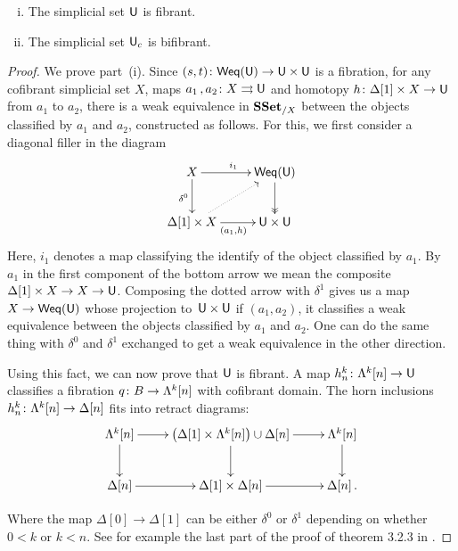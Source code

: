 \documentclass[reqno,10pt,a4paper,oneside,draft]{amsart}
\begin{document}
\begin{theorem} \label{thm:fibrancy-of-u-and-uc} \hfill 
\begin{enumerate}[(i)] 
\item The simplicial set $\mathsf{U}$ is fibrant. 
\item The simplicial set $\mathsf{U}_c$ is bifibrant. 
\end{enumerate}
\end{theorem}

\begin{proof} We prove part~(i). Since
$(s, t) \colon \mathsf{Weq}(\mathsf{U}) \rightarrow \mathsf{U} \times \mathsf{U}$ is a fibration, for any cofibrant 
simplicial set $X$,  maps $a_1 \, , a_2 \colon X \rightrightarrows \mathsf{U}$ and homotopy $h \colon \Delta[1] \times X \rightarrow \mathsf{U}$ from $a_1$ to $a_2$, there is a weak equivalence in $\mathbf{SSet}_{/X}$ between the objects classified by $a_1$ and $a_2$, constructed as follows. For this, we first consider a diagonal filler in the
diagram
\[
\xymatrix{ X \ar[r]^{i_1} \ar[d]_{\delta^0} & \mathsf{Weq}(\U) \ar@{->>}[d] \\
\Delta[1] \times X \ar[r]_{(a_1,h)} \ar@{.>}[ur] & \U \times \U
}
\]
Here, $i_1$ denotes a map classifying the identify of the object classified by $a_1$. By $a_1$ in the first component of the bottom arrow we mean the composite $\Delta[1] \times X \rightarrow X \rightarrow \mathsf{U}$. Composing the dotted arrow with $\delta^1$ gives us a map $X \rightarrow  \mathsf{Weq}(\mathsf{U})$ whose projection to~$\mathsf{U} \times \mathsf{U}$ if $(a_1,a_2)$, \ie it classifies a weak equivalence between the objects classified by $a_1$ and $a_2$. One can do the same thing with $\delta^0$ and $\delta^1$ exchanged to get a weak equivalence in the other direction.

Using this fact, we can now prove that $\mathsf{U}$ is fibrant. A map $h^k_n \colon \Lambda^k[n] \rightarrow \mathsf{U} $ classifies a fibration $q \colon B \rightarrow \Lambda^k[n]$ with cofibrant domain. The horn inclusions $h^k_n \colon \Lambda^k [n] \rightarrow \Delta[n]$ fits into retract diagrams:
\[
\xymatrix{\Lambda^k[n] \ar[d] \ar[r] & \big( \Delta[1] \times \Lambda^k[n] \big) \cup \Delta[n] \ar[d] \ar[r] & \Lambda^k[n] \ar[d]  \\
\Delta[n] \ar[r] & \Delta[1] \times \Delta[n] \ar[r] & \Delta[n] \, .
}\]

Where the map $\Delta[0] \rightarrow \Delta[1]$ can be either $\delta^0$ or $\delta^1$ depending on whether $0<k$ or $k<n$. See for example the last part of the proof of theorem 3.2.3 in \cite{joyal-tierney:simplicial-homotopy-theory}.


\end{proof}
\end{document}
